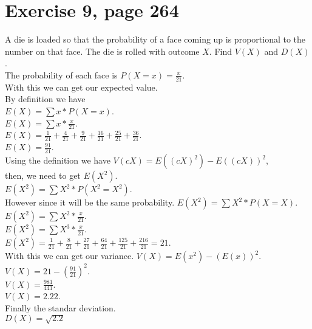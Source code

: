 \documentclass[]{article}
\begin{document}
\section{Exercise 9, page 264}
A die is loaded so that the probability of a face coming up is proportional to the number on that face. The die is rolled with outcome $X$. Find $V(X)$ and $D(X)$.\\
The probability of each face is
$P(X= x) = \frac{x}{21}$.\\
With this we can get our expected value.\\
By definition we have\\
$E(X) = \sum x * P(X=x)$.\\
$E(X) = \sum x * \frac{x}{21}$.\\
$E(X) = \frac{1}{21} + \frac{4}{21} + \frac{9}{21} + \frac{16}{21} + \frac{25}{21} + \frac{36}{21}$.\\
$E(X) = \frac{91}{21} $.\\
Using the definition we have $V(cX) = E((cX)^{2})-E((cX))^{2}$,\\
then, we need to get $E(X^{2})$.\\
$E(X^{2}) = \sum X^{2}*P(X^{2} = X^{2})$.\\
However since it will be the same probability.
$E(X^{2}) = \sum X^{2}*P(X = X)$.\\
$E(X^{2}) = \sum X^{2}*\frac{x}{21}$.\\
$E(X^{2}) = \sum X^{3}*\frac{x}{21}$.\\
$E(X^{2}) = \frac{1}{21} + \frac{8}{21} +\frac{27}{21} + \frac{64}{21} + \frac{125}{21} + \frac{216}{21} = 21 $.\\
With this we can get our variance.
$V(X) = E(x^{2})- (E(x))^{2}$.\\
$V(X)  = 21 - (\frac{91}{21})^{2}$.\\
$V(X)  = \frac{981}{441}$.\\
$V(X)  = 2.22$.\\
Finally the standar deviation.\\
$D(X) = \sqrt{2.2}$\\
\end{document}
